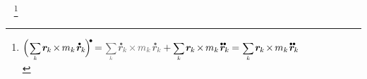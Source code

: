 \vspace{-0.6em}\noindent
{}~
\footnote{${%
\Bigl( \hspace{.2ex} \scalebox{.8}{$ \displaystyle\sum_{\smash{k}} $} \hspace{.25ex} \locationvector_{\hspace{-0.1ex}k} \hspace{-0.25ex} \times \hspace{-0.2ex} m_k \hspace{.2ex} \mathdotabove{\locationvector}_{\hspace{-0.1ex}k} \hspace{-0.2ex} \Bigr)^{\hspace{-0.15em}\tikz[baseline=-0.2ex]\draw[black, fill=black] (0,0) circle (.28ex);} \hspace{-0.2ex}
= \hspace{.1ex}
\mathcolor{black!60}{ \scalebox{.8}{$ \displaystyle\sum_{\smash{k}} $} \hspace{.25ex} \mathdotabove{\locationvector}_{\hspace{-0.1ex}k} \hspace{-0.25ex} \times \hspace{-0.2ex} m_k \hspace{.2ex} \mathdotabove{\locationvector}_{\hspace{-0.1ex}k} } \hspace{-.1ex}
+ \scalebox{.8}{$ \displaystyle\sum_{\smash{k}} $} \hspace{.25ex} \locationvector_{\hspace{-0.1ex}k} \hspace{-0.25ex} \times \hspace{-0.2ex} m_k \hspace{.2ex} \mathdotdotabove{\locationvector}_{\hspace{-0.1ex}k} \hspace{-.1ex}
= \hspace{.1ex}
\scalebox{.8}{$ \displaystyle\sum_{\smash{k}} $} \hspace{.25ex} \locationvector_{\hspace{-0.1ex}k} \hspace{-0.25ex} \times \hspace{-0.2ex} m_k \hspace{.2ex} \mathdotdotabove{\locationvector}_{\hspace{-0.1ex}k}
}$
\\
}
